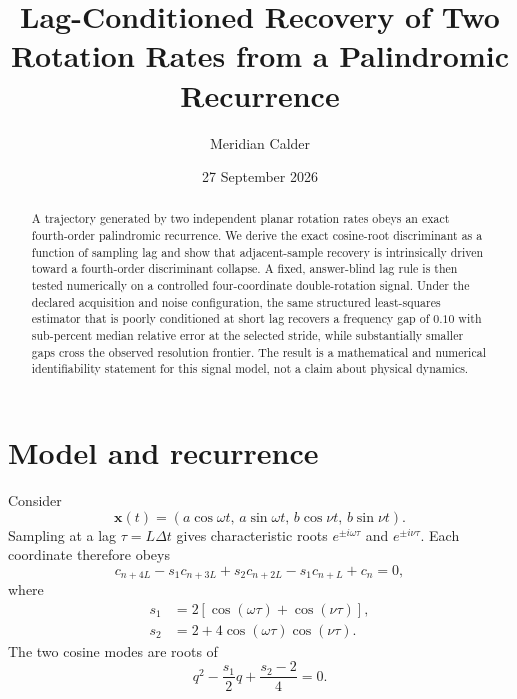 \documentclass[aps,prd,preprint,nofootinbib]{revtex4-2}
\begin{document}
\title{Lag-Conditioned Recovery of Two Rotation Rates from a Palindromic Recurrence}
\author{Meridian Calder}
\date{27 September 2026}

\begin{abstract}
A trajectory generated by two independent planar rotation rates obeys an exact
fourth-order palindromic recurrence.  We derive the exact cosine-root
discriminant as a function of sampling lag and show that adjacent-sample
recovery is intrinsically driven toward a fourth-order discriminant collapse.
A fixed, answer-blind lag rule is then tested numerically on a controlled
four-coordinate double-rotation signal.  Under the declared acquisition and
noise configuration, the same structured least-squares estimator that is
poorly conditioned at short lag recovers a frequency gap of $0.10$ with
sub-percent median relative error at the selected stride, while substantially
smaller gaps cross the observed resolution frontier.  The result is a
mathematical and numerical identifiability statement for this signal model,
not a claim about physical dynamics.
\end{abstract}

\maketitle

\section{Model and recurrence}

Consider
\begin{equation}
\bm x(t)=
\left(
a\cos\omega t,\,
a\sin\omega t,\,
b\cos\nu t,\,
b\sin\nu t
\right).
\end{equation}
Sampling at a lag $\tau=L\Delta t$ gives characteristic roots
$e^{\pm i\omega\tau}$ and $e^{\pm i\nu\tau}$.
Each coordinate therefore obeys
\begin{equation}
c_{n+4L}-s_1c_{n+3L}+s_2c_{n+2L}
-s_1c_{n+L}+c_n=0,
\label{eq:recurrence}
\end{equation}
where
\begin{align}
s_1&=2\left[\cos(\omega\tau)+\cos(\nu\tau)\right],\\
s_2&=2+4\cos(\omega\tau)\cos(\nu\tau).
\end{align}
The two cosine modes are roots of
\begin{equation}
q^2-\frac{s_1}2q+\frac{s_2-2}4=0.
\end{equation}
\end{document}
